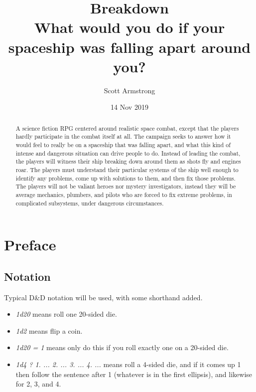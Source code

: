 \documentclass[a4paper]{article}
\title{Breakdown \\ {\large What would you do if your spaceship was falling apart around you?}}
\author{Scott Armstrong}
\date{14 Nov 2019}
\begin{document}
\maketitle

\begin{abstract}

A science fiction RPG centered around realistic space combat, except that the players hardly participate in the combat itself at all. The campaign seeks to answer how it would feel to really be on a spaceship that was falling apart, and what this kind of intense and dangerous situation can drive people to do. Instead of leading the combat, the players will witness their ship breaking down around them as shots fly and engines roar. The players must understand their particular systems of the ship well enough to identify any problems, come up with solutions to them, and then fix those problems. The players will not be valiant heroes nor mystery investigators, instead they will be average mechanics, plumbers, and pilots who are forced to fix extreme problems, in complicated subsystems, under dangerous circumstances.

\end{abstract}

{
  \hypersetup{linkcolor=black}
  \setcounter{tocdepth}{2}
  \tableofcontents
}

\section{Preface} \label{preface}

\subsection{Notation} \label{preface_notation}
Typical D\&D notation will be used, with some shorthand added. 
\begin{itemize}
\item \textit{1d20} means roll one 20-sided die.
\item \textit{1d2} means flip a coin.
\item \textit{1d20 = 1} means only do this if you roll exactly one on a 20-sided die.
\item \textit{1d4 ? 1. ... 2. ... 3. ... 4. ...} means roll a 4-sided die, and if it comes up 1 then follow the sentence after 1 (whatever is in the first ellipsis), and likewise for 2, 3, and 4.
\end{itemize}
\end{document}
